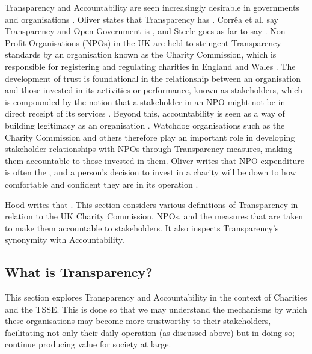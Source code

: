 Transparency and Accountability are seen increasingly desirable in governments and organisations \cite{hood_accountability_2010, oliver_what_2004, heald_fiscal_2003}. Oliver states that Transparency has  \cite{oliver_what_2004}.  Corr\^ea et al. say Transparency and Open Government is  \cite{correa_really_2014}, and Steele goes as far to say  \cite{steele_open-source_2012}.
%
Non-Profit Organisations (NPOs) in the UK are held to stringent Transparency standards by an organisation known as the Charity Commission, which is responsible for registering and regulating charities in England and Wales  \cite{hm_government_charity_????}. The development of trust is foundational in the relationship between an organisation and those invested in its activities or performance, known as stakeholders, which is compounded by the notion that a stakeholder in an NPO might not be in direct receipt of its services \cite{macmillan_relationship_2005, krashinsky_stakeholder_1997}. Beyond this, accountability is seen as a way of building legitimacy as an organisation \cite{anheier_accountability_2009}. Watchdog organisations such as the Charity Commission and others therefore play an important role in developing stakeholder relationships with NPOs through Transparency measures, making them accountable to those invested in them. Oliver writes that NPO expenditure is often the , and a person's decision to invest in a charity will be down to how comfortable and confident they are in its operation \cite{oliver_what_2004}.


Hood writes that  \cite{hood_transparency_2006-1}. This section considers various definitions of Transparency in relation to the UK Charity Commission, NPOs, and the measures that are taken to make them accountable to stakeholders. It also inspects Transparency's synonymity with Accountability.

\subsection{What is Transparency?}
This section explores Transparency and Accountability in the context of Charities and the TSSE. This is done so that we may understand the mechanisms by which these organisations may become more trustworthy to their stakeholders, facilitating not only their daily operation (as discussed above) but in doing so; continue producing value for society at large.

